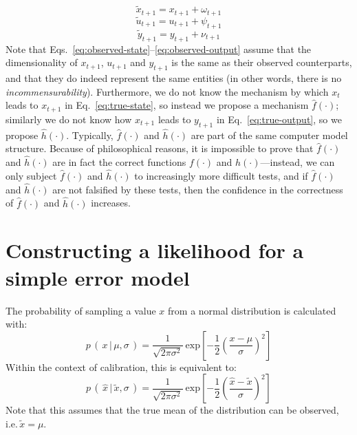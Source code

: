 \begin{equation}\label{eq:observed-state}
\tilde{x}_{t+1}=x_{t+1} + \omega_{t+1}
\end{equation}
\begin{equation}\label{eq:observed-forcing}
\tilde{u}_{t+1}=u_{t+1} + \psi_{t+1}
\end{equation}
\begin{equation}\label{eq:observed-output}
\tilde{y}_{t+1}=y_{t+1} + \nu_{t+1}
\end{equation}
Note that Eqs.~\ref{eq:observed-state}--\ref{eq:observed-output} assume that the dimensionality of $x_{t+1}$, $u_{t+1}$ and $y_{t+1}$ is the same as their observed counterparts, and that they do indeed represent the same entities (in other words, there is no \textit{incommensurability}). Furthermore, we do not know the mechanism by which $x_t$ leads to $x_{t+1}$ in Eq.~\ref{eq:true-state}, so instead we propose a mechanism $\hat{f}(\cdot{})$; similarly we do not know how $x_{t+1}$ leads to $y_{t+1}$ in Eq.~\ref{eq:true-output}, so we propose $\hat{h}(\cdot{})$. Typically, $\hat{f}(\cdot{})$ and $\hat{h}(\cdot{})$ are part of the same computer model structure. Because of philosophical reasons, it is impossible to prove that $\hat{f}(\cdot{})$ and $\hat{h}(\cdot{})$ are in fact the correct functions $f(\cdot{})$ and $h(\cdot{})$---instead, we can only subject $\hat{f}(\cdot{})$ and $\hat{h}(\cdot{})$ to increasingly more difficult tests, and if $\hat{f}(\cdot{})$ and $\hat{h}(\cdot{})$ are not falsified by these tests, then the confidence in the correctness of $\hat{f}(\cdot{})$ and $\hat{h}(\cdot{})$ increases.



\section{Constructing a likelihood for a simple error model}
The probability of sampling a value $x$ from a normal distribution  is calculated with:
\begin{equation}\label{eq:normal-distribution}
p\,(\,x\,|\,\mu,\sigma\,) = \frac{1}{\sqrt{2\pi\sigma^2}}\:\mathrm{exp}\left[{-\frac{1}{2}\left(\frac{x-\mu}{\sigma}\right)^2}\right]
\end{equation}
Within the context of calibration, this is equivalent to:
\begin{equation}\label{eq:normal-distribution-calibration}
p\,(\,\hat{x}\,|\,\tilde{x},\sigma\,) = \frac{1}{\sqrt{2\pi\sigma^2}}\:\mathrm{exp}\left[{-\frac{1}{2}\left(\frac{\hat{x}-\tilde{x}}{\sigma}\right)^2}\right]
\end{equation}
Note that this assumes that the true mean of the distribution can be observed, i.e.\,$\tilde{x}=\mu$.

